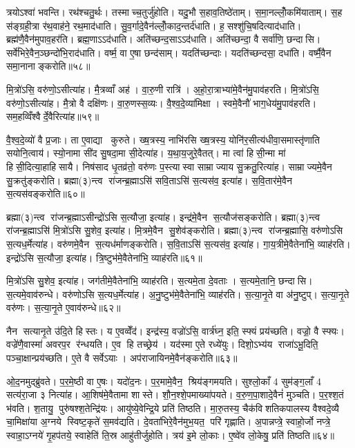 त्रयोऽश्वा॑ भवन्ति। रथ॑श्चतु॒र्थः। तस्माच्च॒तुर्जु॑होति। यदु॒भौ स॒हाव॒तिष्ठे॑ताम्। स॒मा॒नल्लोँ॒कमि॑याताम्। स॒ह स॑ङ्ग्रही॒त्रा र॑थ॒वाह॑ने॒ रथ॒माद॑धाति। सु॒व॒र्गादे॒वैन॑ल्लोँ॒काद॒न्तर्द॑धाति। ह॒सश्शु॑चि॒षदित्याद॑धाति। ब्रह्म॑णै॒वैन॑मुपाव॒हर॑ति। ब्रह्म॒णाऽऽद॑धाति। अति॑च्छन्द॒साऽऽद॑धाति। अति॑च्छन्दा॒ वै सर्वा॑णि॒ छन्दासि। सर्वे॑भिरे॒वैन॒ञ्छन्दो॑भि॒राद॑धाति। वर्ष्म॒ वा ए॒षा छन्द॑साम्। यदति॑च्छन्दाः। यदति॑च्छन्दसा॒ दधा॑ति। वर्ष्मै॒वैन समा॒नानाङ्करोति॥५८॥\anuvakamend[प॒द्य॒न्ते॒ द॒धा॒ति॒ वी॒र्ये॑णेत्या॒हानात्यै॒ प्रति॑ष्ठित्यै॒ ब्रह्म॒णाऽऽद॑धाति स॒प्त च॑]

मि॒त्रो॑ऽसि॒ वरु॑णो॒ऽसीत्या॑ह। मै॒त्रव्वाँ अह॑। वा॒रु॒णी रात्रि॑। अ॒हो॒रा॒त्राभ्या॑मे॒वैन॑मु॒पाव॑हरति। मि॒त्रो॑ऽसि॒ वरु॑णो॒ऽसीत्या॑ह। मै॒त्रो वै दक्षि॑णः। वा॒रु॒णस्स॒व्यः। वै॒श्व॒दे॒व्या॑मिक्षा। स्वमे॒वैनौ॑ भाग॒धेय॑मु॒पाव॑हरति। सम॒हव्विँश्वैर्दे॒वैरित्या॑ह॥५९॥

वै॒श्व॒दे॒व्यो॑ वै प्र॒जाः। ता ए॒वाद्या कुरुते। ख्ष॒त्रस्य॒ नाभि॑रसि ख्ष॒त्रस्य॒ योनि॑र॒सीत्य॑धीवा॒समास्तृ॑णाति सयोनि॒त्वाय॑। स्यो॒नामा सी॑द सु॒षदा॒मा सी॒देत्या॑ह। य॒था॒य॒जुरे॒वैतत्। मा त्वा॑ हिसी॒न्मा मा॑ हिसी॒दित्या॒हाहिसायै। निष॑साद धृ॒तव्र॑तो॒ वरु॑णः प॒स्त्यास्वा साम्राज्याय सु॒क्रतु॒रित्या॑ह। साम्राज्यमे॒वैन सु॒क्रतु॑ङ्करोति। ब्रह्मा(३)न्त्व रा॑जन्ब्र॒ह्माऽसि॑ सवि॒ताऽसि॑ स॒त्यस॑व॒ इत्या॑ह। स॒वि॒तार॑मे॒वैन स॒त्यस॑वङ्करोति॥६०॥

ब्रह्मा(३)न्त्व रा॑जन्ब्र॒ह्माऽसीन्द्रो॑ऽसि स॒त्यौजा॒ इत्या॑ह। इन्द्र॑मे॒वैन स॒त्यौज॑सङ्करोति। ब्रह्मा(३)न्त्व रा॑जन्ब्र॒ह्माऽसि॑ मि॒त्रो॑ऽसि सु॒शेव॒ इत्या॑ह। मि॒त्रमे॒वैन सु॒शेव॑ङ्करोति। ब्रह्मा(३)न्त्व रा॑जन्ब्र॒ह्मासि॒ वरु॑णोऽसि स॒त्यध॒र्मेत्या॑ह। वरु॑णमे॒वैन स॒त्यध॑र्माणङ्करोति। स॒वि॒ताऽसि॑ स॒त्यस॑व॒ इत्या॑ह। गा॒य॒त्रीमे॒वैतेना॑भि॒ व्याह॑रति। इन्द्रो॑ऽसि स॒त्यौजा॒ इत्या॑ह। त्रि॒ष्टुभ॑मे॒वैतेना॑भि॒ व्याह॑रति॥६१॥

मि॒त्रो॑ऽसि सु॒शेव॒ इत्या॑ह। जग॑तीमे॒वैतेना॑भि॒ व्याह॑रति। स॒त्यमे॒ता दे॒वताः। स॒त्यमे॒तानि॒ छन्दासि। स॒त्यमे॒वाव॑रुन्धे। वरु॑णोऽसि स॒त्यध॒र्मेत्या॑ह। अ॒नु॒ष्टुभ॑मे॒वैतेना॑भि॒ व्याह॑रति। स॒त्या॒नृ॒ते वा अ॑नु॒ष्टुप्। स॒त्या॒नृ॒ते वरु॑णः। स॒त्या॒नृ॒ते ए॒वाव॑रुन्धे॥६२॥

नैन सत्यानृ॒ते उ॑दि॒ते हिस्तः। य ए॒वव्वेँद॑। इन्द्र॑स्य॒ वज्रो॑ऽसि॒ वार्त्र॑घ्न॒ इति॒ स्फ्यं प्रय॑च्छति। वज्रो॒ वै स्फ्यः। वज्रे॑णै॒वास्मा॑ अवरप॒र र॑न्धयति। ए॒व हि तच्छ्रेय॑। यद॑स्मा ए॒ते रध्ये॑युः। दिशो॒ऽभ्य॑य राजा॑ऽभू॒दिति॒ पञ्चा॒क्षान्प्रय॑च्छति। ए॒ते वै सर्वेऽयाः। अप॑राजायिनमे॒वैन॑ङ्करोति॥६३॥

ओ॒द॒नमुद्ब्रु॑वते। प॒र॒मे॒ष्ठी वा ए॒षः। यदो॑द॒नः। प॒र॒मामे॒वैन॒ श्रिय॑ङ्गमयति। सुश्लो॒काँ 4 सुम॑ङ्ग॒लाँ 4 सत्य॑रा॒जा ३ नित्या॑ह। आ॒शिष॑मे॒वैतामा शास्ते। शौ॒न॒श्शे॒पमाख्या॑पयते। व॒रु॒ण॒पा॒शादे॒वैनं॑ मुञ्चति। प॒र॒श्श॒तं भ॑वति। श॒तायु॒ पुरु॑षश्श॒तेन्द्रि॑यः। आयु॑ष्ये॒वेन्द्रि॒ये प्रति॑ तिष्ठति। मा॒रु॒तस्य॒ चैक॑विशतिकपालस्य वैश्वदे॒व्यै चा॒मिक्षा॑या अ॒ग्नये स्विष्ट॒कृते॑ स॒मव॑द्यति। दे॒वता॑भिरे॒वैन॑मुभ॒यत॒ परि॑ गृह्णाति। अ॒पान्नप्त्रे॒ स्वाहो॒र्जो नप्त्रे॒ स्वाहा॒ऽग्नये॑ गृ॒हप॑तये॒ स्वाहेति॑ ति॒स्र आहु॑तीर्जुहोति। त्रय॑ इ॒मे लो॒काः। ए॒ष्वे॑व लो॒केषु॒ प्रति॑ तिष्ठति॥६४॥

